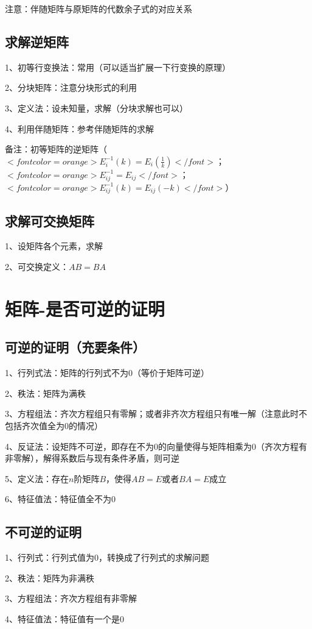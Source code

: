 注意：伴随矩阵与原矩阵的代数余子式的对应关系



\subsection{求解逆矩阵}

1、初等行变换法：常用（可以适当扩展一下行变换的原理）

2、分块矩阵：注意分块形式的利用

3、定义法：设未知量，求解（分块求解也可以）

4、利用伴随矩阵：参考伴随矩阵的求解

备注：初等矩阵的逆矩阵（$ <font color=orange>E_{i}^{-1}(k)=E_{i}(\frac 1 k)</font> $；$ <font color=orange>E_{ij}^{-1}=E_{ij}</font> $；$ <font color=orange>E_{ij}^{-1}(k)=E_{ij}(-k)</font> $）



\subsection{求解可交换矩阵}

1、设矩阵各个元素，求解

2、可交换定义：$ AB=BA $

\section{矩阵-是否可逆的证明}



\subsection{可逆的证明（充要条件）}

1、行列式法：矩阵的行列式不为0（等价于矩阵可逆）

2、秩法：矩阵为满秩

3、方程组法：齐次方程组只有零解；或者非齐次方程组只有唯一解（注意此时不包括齐次值全为0的情况）

4、反证法：设矩阵不可逆，即存在不为0的向量使得与矩阵相乘为0（齐次方程有非零解），解得系数后与现有条件矛盾，则可逆

5、定义法：存在$ n $阶矩阵$ B $，使得$ AB=E $或者$ BA=E $成立

6、特征值法：特征值全不为0



\subsection{不可逆的证明}

1、行列式：行列式值为0，转换成了行列式的求解问题

2、秩法：矩阵为非满秩

3、方程组法：齐次方程组有非零解

4、特征值法：特征值有一个是0

